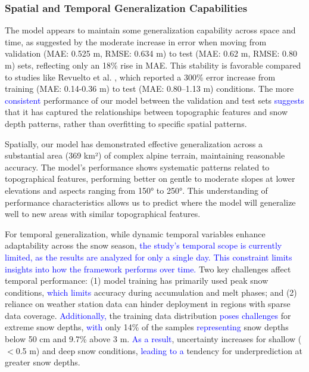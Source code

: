 \documentclass[preprint,12pt]{elsarticle}
\begin{document}
\subsubsection{Spatial and Temporal Generalization Capabilities}

The model appears to maintain some generalization capability across space and time, as suggested by the moderate increase in error when moving from validation (MAE: 0.525 m, RMSE: 0.634 m) to test (MAE: 0.62 m, RMSE: 0.80 m) sets, reflecting only an 18\% rise in MAE. This stability is favorable compared to studies like Revuelto et al. \cite{revuelto2020random}, which reported a 300\% error increase from training (MAE: 0.14-0.36 m) to test (MAE: 0.80--1.13 m) conditions. The more \textcolor{blue}{consistent} performance of our model between the validation and test sets \textcolor{blue}{suggests} that it has captured the relationships between topographic features and snow depth patterns, rather than overfitting to specific spatial patterns.

Spatially, our model has demonstrated effective generalization across a substantial area (369 km²) of complex alpine terrain, maintaining reasonable accuracy. The model's performance shows systematic patterns related to topographical features, performing better on gentle to moderate slopes at lower elevations and aspects ranging from 150° to 250°. This understanding of performance characteristics allows us to predict where the model will generalize well to new areas with similar topographical features.

For temporal generalization, while dynamic temporal variables enhance adaptability across the snow season, \textcolor{blue}{the study's temporal scope is currently limited, as the results are analyzed for only a single day. This constraint limits insights into how the framework performs over time.} Two key challenges affect temporal performance: (1) model training has primarily used peak snow conditions, \textcolor{blue}{which limits} accuracy during accumulation and melt phases; and (2) reliance on weather station data can hinder deployment in regions with sparse data coverage. \textcolor{blue}{Additionally,} the training data distribution \textcolor{blue}{poses challenges} for extreme snow depths, \textcolor{blue}{with} only 14\% of the samples \textcolor{blue}{representing} snow depths below 50 cm and 9.7\% above 3 m. \textcolor{blue}{As a result}, uncertainty increases for shallow ($<$0.5 m) and deep snow conditions, \textcolor{blue}{leading to a} tendency for underprediction at greater snow depths.
\end{document}
